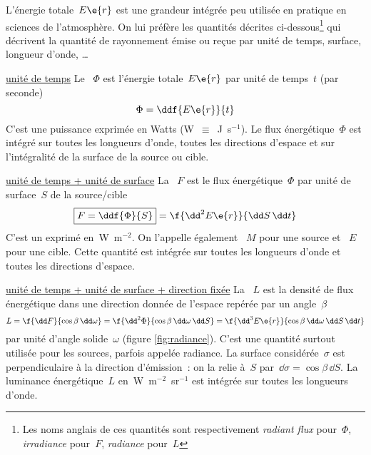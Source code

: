 \sk
L'énergie totale~$E\e{r}$ est une grandeur intégrée peu utilisée en pratique en sciences de l'atmosphère. On lui préfère les quantités décrites ci-dessous\footnote{Les noms anglais de ces quantités sont respectivement \emph{radiant flux} pour~$\Phi$, \emph{irradiance} pour~$F$, \emph{radiance} pour~$L$} qui décrivent la quantité de rayonnement émise ou reçue par unité de temps, surface, longueur d'onde, \ldots
\begin{finger}
\item \underline{unité de temps} Le ~$\Phi$ est l'énergie totale~$E\e{r}$ par unité de temps~$t$ (par seconde) $$ \Phi = \ddf{E\e{r}}{t} $$ C'est une puissance exprimée en Watts (W~$\equiv$~J~s$^{-1}$). Le flux énergétique~$\Phi$ est intégré sur toutes les longueurs d'onde, toutes les directions d'espace et sur l'intégralité de la surface de la source ou cible.
\item \underline{unité de temps + unité de surface} La ~$F$ est le flux énergétique~$\Phi$ par unité de surface~$S$ de la source/cible $$ \boxed{ F = \ddf{\Phi}{S} } = \f{\dd^2 E\e{r}}{\dd S \, \dd t} $$ C'est un  exprimé en~W~m$^{-2}$. On l'appelle également ~$M$ pour une source et ~$E$ pour une cible. Cette quantité est intégrée sur toutes les longueurs d'onde et toutes les directions d'espace.
\item \underline{unité de temps + unité de surface + direction fixée} La ~$L$ est la densité de flux énergétique dans une direction donnée de l'espace repérée par un angle~$\beta$ $$ L = \f{\dd F}{\cos\beta \, \dd \omega} = \f{\dd^2 \Phi}{\cos\beta \, \dd \omega \, \dd S} = \f{\dd^3 E\e{r}}{\cos\beta \, \dd \omega \, \dd S \, \dd t} $$ 
par unité d'angle solide~$\omega$ (figure \ref{fig:radiance}). C'est une quantité surtout utilisée pour les sources, parfois appelée radiance. La surface considérée~$\sigma$ est perpendiculaire à la direction d'émission~: on la relie à~$S$ par~$\dd \sigma = \cos\beta \, \dd S$. La luminance énergétique~$L$ en~W~m$^{-2}$~sr$^{-1}$ est intégrée sur toutes les longueurs d'onde.

\end{finger}
